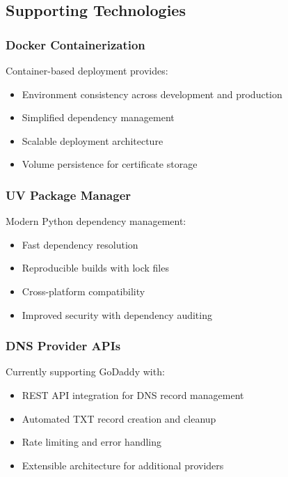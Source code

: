 \subsection{Supporting Technologies}

\subsubsection{Docker Containerization}
Container-based deployment provides:
\begin{itemize}
    \item Environment consistency across development and production
    \item Simplified dependency management
    \item Scalable deployment architecture
    \item Volume persistence for certificate storage
\end{itemize}

\subsubsection{UV Package Manager}
Modern Python dependency management:
\begin{itemize}
    \item Fast dependency resolution
    \item Reproducible builds with lock files
    \item Cross-platform compatibility
    \item Improved security with dependency auditing
\end{itemize}

\subsubsection{DNS Provider APIs}
Currently supporting GoDaddy with:
\begin{itemize}
    \item REST API integration for DNS record management
    \item Automated TXT record creation and cleanup
    \item Rate limiting and error handling
    \item Extensible architecture for additional providers
\end{itemize}

 